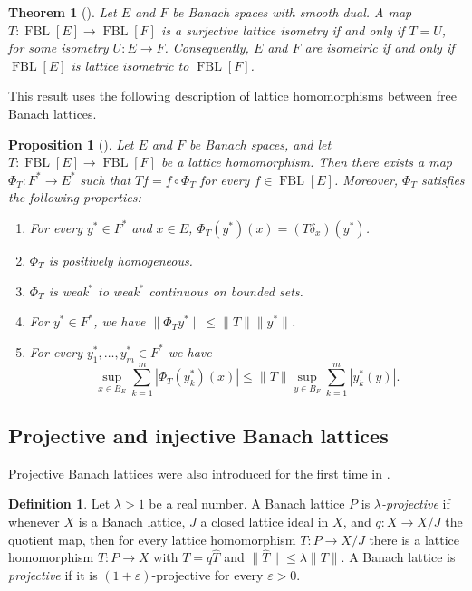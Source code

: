 \documentclass{memo-l}
\newtheorem{thm}[theorem]{Theorem}
\newtheorem{prop}[theorem]{Proposition}
\theoremstyle{definition}
\newtheorem{defn}[theorem]{Definition}
\theoremstyle{remark}
\numberwithin{section}{chapter}
\numberwithin{equation}{chapter}
\newcommand{\FBL}[1]{\operatorname{FBL}[#1]}
\begin{document}
\begin{thm}[{\cite[Theorem 10.18]{oikhberg_etal2022}}]\label{thm:FBL_isometries}
    Let $E$ and $F$ be Banach spaces with smooth dual. A map $T\colon
    \FBL E\to \FBL F$ is a surjective lattice isometry if and only if
    $T=\bar{U}$, for some isometry $U\colon E\to F$.
    Consequently, $E$ and $F$ are isometric if and only if $\FBL E$ is
    lattice isometric to $\FBL F$.
\end{thm}

This result uses the following description of lattice homomorphisms
between free Banach lattices.

\begin{prop}[{\cite[Proposition 10.1]{oikhberg_etal2022}}]
    Let $E$ and $F$ be Banach spaces, and let $T\colon \FBL E\to \FBL
    F$ be a lattice homomorphism. Then there exists a map $\Phi
    _T\colon F^{*}\to E^{*}$ such that $Tf=f\circ \Phi _T$ for every
    $f \in \FBL E$. Moreover, $\Phi _T$ satisfies the following
    properties:
    \begin{enumerate}
        \item For every $y^{*}\in F^{*}$ and $x \in E$, $\Phi
            _T(y^{*})(x)=(T\delta _x)(y^{*})$.
        \item $\Phi _T$ is positively homogeneous.
        \item $\Phi _T$ is weak$^*$ to weak$^*$ continuous on bounded
            sets.
        \item For $y^{*}\in F^{*}$, we have $\|\Phi _Ty^{*}\|\le \|T\|
            \|y^{*}\|$.
        \item For every $y_1^{*},\ldots ,y_m^{*}\in F^{*}$ we have
            \[
            \sup_{x \in B_E} \sum_{k=1}^{m}|\Phi _T(y_k^{*})(x)| \le
            \|T\| \sup_{y \in B_F} \sum_{k=1}^{m} |y_k^{*}(y)|.
            \]
    \end{enumerate}
\end{prop}

\subsection{Projective and injective Banach lattices}\label{sec:background_projective}

Projective Banach lattices were also introduced for the first time in
\cite{de_pagter_wickstead2015}.

\begin{defn}
    Let $\lambda >1$ be a real number. A Banach lattice $P$ is
    \emph{$\lambda $-projective} if whenever $X$ is a Banach lattice,
    $J$ a closed lattice ideal in $X$, and $q\colon X\to X/J$
    the quotient map, then for every lattice homomorphism
    $T\colon P\to X/J$ there is a lattice homomorphism
    $\hat{T}\colon P\to X$ with $T=q \hat{T}$ and $\|\hat{T}\|\le
    \lambda \|T\|$.
    A Banach lattice is \emph{projective} if it is $(1+\varepsilon
    )$-projective for every $\varepsilon >0$.
\end{defn}
\end{document}
